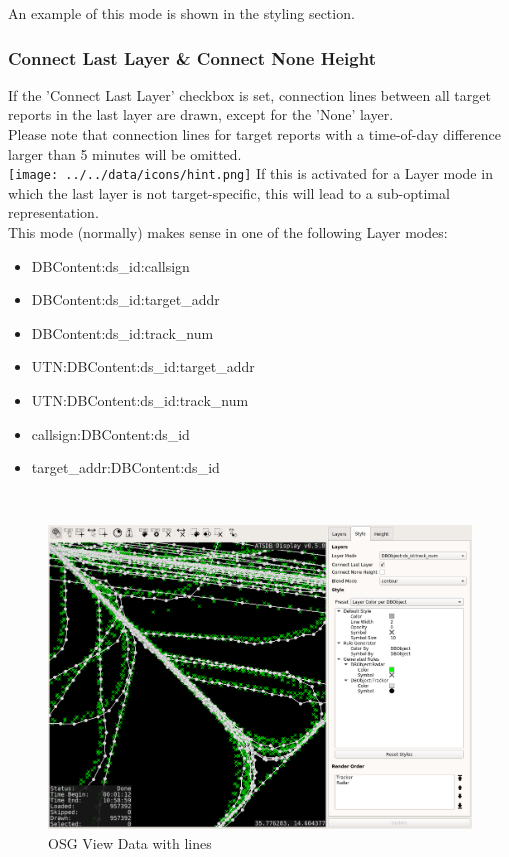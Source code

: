 An example of this mode is shown in the styling section.


\subsubsection{Connect Last Layer \& Connect None Height}

If the 'Connect Last Layer' checkbox is set, connection lines between all target reports in the last layer are drawn, except for the 'None' layer. \\

Please note that connection lines for target reports with a time-of-day difference larger than 5 minutes will be omitted. \\

\texttt{[image: ../../data/icons/hint.png]} If this is activated for a Layer mode in which the last layer is not target-specific, this will lead to a sub-optimal representation. \\

This mode (normally) makes sense in one of the following Layer modes:

\begin{itemize}
 \item DBContent:ds\_id:callsign
 \item DBContent:ds\_id:target\_addr
 \item DBContent:ds\_id:track\_num
 \item UTN:DBContent:ds\_id:target\_addr
 \item UTN:DBContent:ds\_id:track\_num
 \item callsign:DBContent:ds\_id 
 \item target\_addr:DBContent:ds\_id
\end{itemize}
\  \\

\begin{figure}[H]
    \hspace*{-2.5cm}
    \includegraphics[width=19cm,frame]{figures/osgview_connect_lines.png}
  \caption{OSG View Data with lines}
\end{figure}


